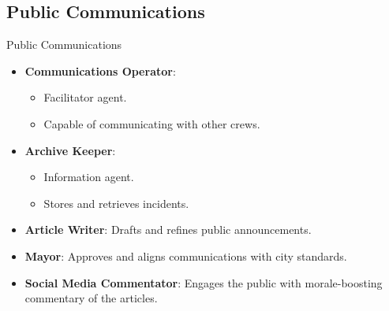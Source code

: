 \subsection{Public Communications}
\begin{frame}{Public Communications}
    \begin{itemize}
        \item \textbf{Communications Operator}: 
        \begin{itemize}
            \item \alert{Facilitator} agent.
            \item Capable of \alert{communicating} with other crews.
        \end{itemize}
        \item \textbf{Archive Keeper}: 
        \begin{itemize}
            \item \alert{Information} agent.
            \item \alert{Stores} and \alert{retrieves} incidents.
        \end{itemize}
        \item \textbf{Article Writer}: Drafts and refines public announcements.
        \item \textbf{Mayor}: Approves and aligns communications with city standards.
        \item \textbf{Social Media Commentator}: Engages the public with morale-boosting commentary of the articles.
    \end{itemize}
    
\end{frame} 